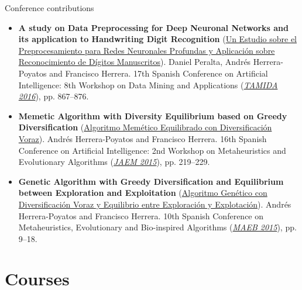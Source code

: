 \documentclass[10pt,a4paper,sans]{moderncv} %
\begin{document}
{\large \textcolor{color1}{Conference contributions}}

	\begin{itemize}
		\item \textbf{A study on Data Preprocessing for Deep Neuronal Networks and its application to Handwriting Digit Recognition} (\textcolor{colorl}{\href{https://www.researchgate.net/publication/308901913_Un_Estudio_sobre_el_Preprocesamiento_para_Redes_Neuronales_Profundas_y_Aplicacion_sobre_Reconocimiento_de_Digitos_Manuscritos}{Un Estudio sobre el Preprocesamiento para Redes Neuronales Profundas y Aplicación sobre Reconocimiento de Dígitos Manuscritos}}). Daniel Peralta, Andrés Herrera-Poyatos and Francisco Herrera. 17th Spanish Conference on Artificial Intelligence: 8th Workshop on Data Mining and Applications (\textcolor{colorl}{\textit{\href{http://www.congresocedi.es/en/tamida}{TAMIDA 2016}}}), pp. 867--876.
		\item \textbf{Memetic Algorithm with Diversity Equilibrium based on Greedy Diversification} (\textcolor{colorl}{\href{https://www.researchgate.net/publication/320701097_Algoritmo_Memetico_Equilibrado_con_Diversificacion_Voraz}{Algoritmo Memético Equilibrado con Diversificación Voraz}}). Andrés Herrera-Poyatos and Francisco Herrera. 16th Spanish Conference on Artificial Intelligence: 2nd Workshop on Metaheuristics and Evolutionary Algorithms (\textcolor{colorl}{\textit{\href{http://simd.albacete.org/caepia15/en/conference/jaem15/}{JAEM 2015}}}), pp. 219--229.
		\item  \textbf{Genetic Algorithm with Greedy Diversification and Equilibrium between Exploration and Exploitation} (\textcolor{colorl}{\href{https://www.researchgate.net/publication/320701127_Algoritmo_Genetico_con_Diversificacion_Voraz_y_Equilibrio_entre_Exploracion_y_Explotacion}{Algoritmo Genético con Diversificación Voraz y Equilibrio entre Exploración y Explotación}}). Andrés Herrera-Poyatos and Francisco Herrera. 10th Spanish Conference on Metaheuristics, Evolutionary and Bio-inspired Algorithms (\textcolor{colorl}{\textit{\href{http://www.eweb.unex.es/eweb/maeb2015/}{MAEB 2015}}}), pp. 9--18.
	\end{itemize}



\vspace*{-2mm}
\section{Courses}
\end{document}

